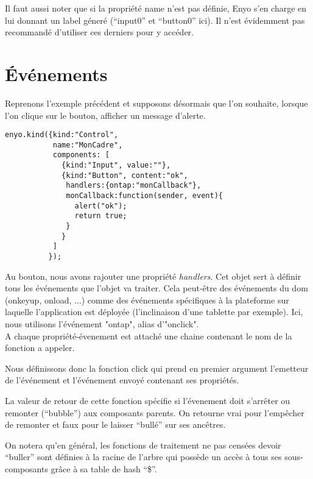 \documentclass[11pt,a4paper]{report}
\begin{document}
Il faut aussi noter que si la propriété name n'est pas définie, Enyo s'en charge en lui donnant 
un label géneré (``input0'' et ``button0'' ici). Il n'est évidemment pas recommandé 
d'utiliser ces derniers pour y accéder.

\section{\'Evénements}

Reprenons l'exemple précédent et supposons désormais que l'on souhaite, lorsque l'on clique sur le bouton, afficher un message d'alerte.

\begin{lstlisting}
enyo.kind({kind:"Control",
           name:"MonCadre",
           components: [
             {kind:"Input", value:""},
             {kind:"Button", content:"ok",
              handlers:{ontap:"monCallback"},
              monCallback:function(sender, event){
                alert("ok");
                return true;
              }
             }
           ]
       	  });
\end{lstlisting}

Au bouton, nous avons rajouter une propriété \emph{handlers}. 
Cet objet sert à définir tous les événements que l'objet va traiter. 
Cela peut-être des événements du dom (onkeyup, onload, ...) comme des événements 
spécifiques à la plateforme sur laquelle l'application est déployée 
(l'inclinaison d'une tablette par exemple). Ici, nous utilisons l'événement "ontap", alias d'"onclick".\\

A chaque propriété-évenement est attaché une chaine contenant le nom de la fonction a appeler.

Nous définissons donc la fonction click qui prend en premier argument l'emetteur de 
l'événement et l'événement envoyé contenant ses propriétés.

La valeur de retour de cette fonction spécifie si l'évenement doit s'arrêter ou 
remonter (``bubble'') aux composants parents. On retourne vrai pour l'empêcher de 
remonter et faux pour le laisser ``bullé'' sur ses ancêtres.

On notera qu'en général, les fonctions de traitement ne pas censées devoir ``buller'' 
sont définies à la racine de l'arbre qui possède un accès à tous ses sous-composants 
grâce à sa table de hash ``\$''.
\end{document}
